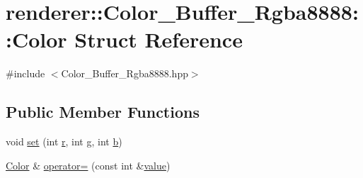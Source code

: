 \hypertarget{structrenderer_1_1_color___buffer___rgba8888_1_1_color}{}\section{renderer\+::Color\+\_\+\+Buffer\+\_\+\+Rgba8888\+::Color Struct Reference}
\label{structrenderer_1_1_color___buffer___rgba8888_1_1_color}


{\ttfamily \#include $<$Color\+\_\+\+Buffer\+\_\+\+Rgba8888.\+hpp$>$}

\subsection*{Public Member Functions}
\begin{DoxyCompactItemize}
\item 
void \mbox{\hyperlink{structrenderer_1_1_color___buffer___rgba8888_1_1_color_afcfb09b3969ab6d86caf666b38f10922}{set}} (int \mbox{\hyperlink{structrenderer_1_1_color___buffer___rgba8888_1_1_color_ae45bf688382ca4182db3439b0c21bc55}{r}}, int \mbox{\hyperlink{structrenderer_1_1_color___buffer___rgba8888_1_1_color_ac305740da991095868487b26e0effbf8}{g}}, int \mbox{\hyperlink{structrenderer_1_1_color___buffer___rgba8888_1_1_color_a917568f3a614e000e50d420572f203a6}{b}})
\item 
\mbox{\hyperlink{structrenderer_1_1_color___buffer___rgba8888_1_1_color}{Color}} \& \mbox{\hyperlink{structrenderer_1_1_color___buffer___rgba8888_1_1_color_a2a0e64c36743063588aaab03047a5eb2}{operator=}} (const int \&\mbox{\hyperlink{structrenderer_1_1_color___buffer___rgba8888_1_1_color_a4fdec280433a51b28ebb3199052f8545}{value}})
\end{DoxyCompactItemize}
